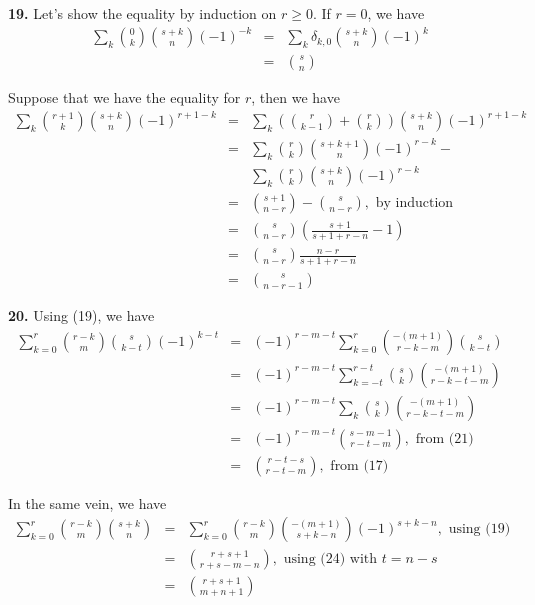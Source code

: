 \documentclass[a4paper,12pt]{article}
\newcommand{\newpar}[1]{\bigskip \noindent \textbf{#1.}}
\begin{document}
\newpar{19} Let's show the equality by induction on $r \ge 0$.  If
$r=0$, we have
\begin{eqnarray*}
  \sum_k {0 \choose k} {s+k \choose n}(-1)^{-k} &=& \sum_k \delta_{k,0}
  {s+k \choose n}(-1)^{k} \\
  &=& {s \choose n}
\end{eqnarray*}

Suppose that we have the equality for $r$, then we have
\begin{eqnarray*}
  \sum_k {{r+1} \choose k} {s+k \choose n}(-1)^{r+1-k} &=&
  \sum_k \left( {r \choose {k-1}} + {r \choose k} \right) {s+k \choose n} (-1)^{r+1-k} \\
  &=& \sum_k {r \choose k} {s+k+1 \choose n} (-1)^{r-k} -\\
  && \sum_k {r \choose k} {s+k \choose n}
  (-1)^{r-k} \\
  &=& {{s+1} \choose {n-r}} - {s \choose {n-r}},\mbox{ by induction} \\
  &=& {s \choose {n-r}} \left( \frac{s+1}{s+1+r-n} - 1 \right) \\
  &=& {s \choose {n-r}} \frac{n-r}{s+1+r-n} \\
  &=& {s \choose {n-r-1}}
\end{eqnarray*}

\newpar{20} Using (19), we have
\begin{eqnarray*}
  \sum_{k=0}^r {{r-k} \choose m} {s \choose {k-t}} (-1)^{k-t} &=&
  (-1)^{r-m-t} \sum_{k=0}^r {{-(m+1)} \choose {r-k-m}} {s \choose
    {k-t}} \\
  &=& (-1)^{r-m-t} \sum_{k=-t}^{r-t} {s \choose k} {{-(m+1)} \choose {r-k-t-m}} \\
  &=& (-1)^{r-m-t} \sum_k {s \choose k} {{-(m+1)} \choose {r-k-t-m}} \\
  &=& (-1)^{r-m-t} {{s-m-1} \choose {r-t-m}}, \mbox{ from (21)} \\
  &=& {{r-t-s} \choose {r-t-m}},\mbox{ from (17)}
\end{eqnarray*}

In the same vein, we have
\begin{eqnarray*}
  \sum_{k=0}^r {{r-k} \choose m} {{s+k} \choose n} &=& \sum_{k=0}^r
      {{r-k} \choose m}
  {{-(m+1)} \choose {s+k-n}} (-1)^{s+k-n}, \mbox{ using (19)} \\
  &=& {{r+s+1} \choose {r+s-m-n}}, \mbox{ using (24) with $t = n-s$} \\
  &=& {{r+s+1} \choose {m+n+1}}
\end{eqnarray*}
\end{document}
